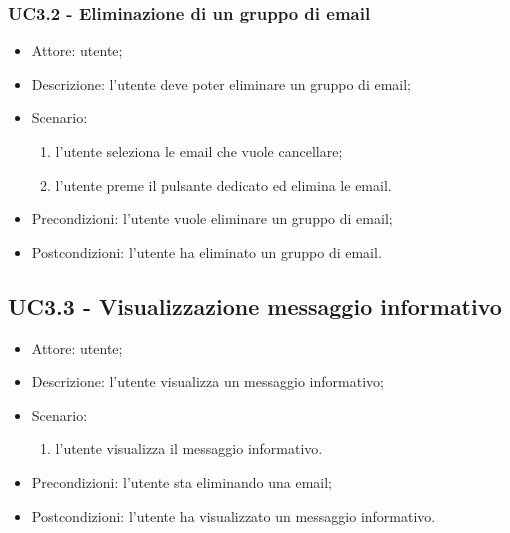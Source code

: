     \subsubsection{UC3.2 - Eliminazione di un gruppo di email}
    \begin{itemize}
        \item Attore: utente;
        \item Descrizione: l'utente deve poter eliminare un gruppo di email;
        \item Scenario:
        \begin{enumerate}
        \item l'utente seleziona le email che vuole cancellare;
        \item l'utente preme il pulsante dedicato ed elimina le email.
        \end{enumerate}
        \item Precondizioni: l'utente vuole eliminare un gruppo di email;
        \item Postcondizioni: l'utente ha eliminato un gruppo di email.
    \end{itemize}

    \subsection{UC3.3 - Visualizzazione messaggio informativo}
    \begin{itemize}
        \item Attore: utente;
        \item Descrizione: l'utente visualizza un messaggio informativo;
        \item Scenario:
        \begin{enumerate}
        \item l'utente visualizza il messaggio informativo.
        \end{enumerate}
        \item Precondizioni: l'utente sta eliminando una email;
        \item Postcondizioni: l'utente ha visualizzato un messaggio informativo.
    \end{itemize}

